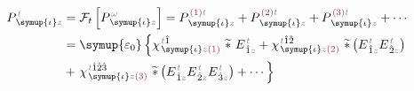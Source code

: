 \begin{subequations}
\begin{align}
	P^{\;\!\mathcolor{gray}{t}}_{\;\! \symup{\iota}\mathcolor{gray}{z}} &= \mathcal F_t \left[ P^{\;\! \mathcolor{gray}{\omega}}_{\;\! \symup{\iota}\mathcolor{gray}{z}} \right] = P^{\;\! \textcolor{Maroon}{(1)} \mathcolor{gray}{t}}_{\;\! \symup{\iota}\mathcolor{gray}{z}} + P^{\;\! \textcolor{Maroon}{(2)} \mathcolor{gray}{t}}_{\;\! \symup{\iota}\mathcolor{gray}{z}} + P^{\;\! \textcolor{Maroon}{(3)} \mathcolor{gray}{t}}_{\;\! \symup{\iota}\mathcolor{gray}{z}} + \cdots \label{P_z_nonlinear} \\ &= {\symup{\varepsilon_0}} \left\{ \chi^{\;\! \mathcolor{gray}{t} \hat{1}}_{\;\! \symup{\iota} \mathcolor{gray}{z} \textcolor{Maroon}{(1)}} ~\widetilde *~ E^{\;\!\mathcolor{gray}{t}}_{\;\! \hat{1} \mathcolor{gray}{z}} + \chi^{\;\! \mathcolor{gray}{t} \hat{1} \hat{2}}_{\;\! \symup{\iota} \mathcolor{gray}{z} \textcolor{Maroon}{(2)}}~\widetilde *\left( E^{\;\!\mathcolor{gray}{t}}_{\;\! \hat{1} \mathcolor{gray}{z}} E^{\;\!\mathcolor{gray}{t}}_{\;\! \hat{2} \mathcolor{gray}{z}} \right) \right. \\ &+ \left. \chi^{\;\! \mathcolor{gray}{t} \hat{1} \hat{2} \hat{3}}_{\;\! \symup{\iota} \mathcolor{gray}{z} \textcolor{Maroon}{(3)}}~\widetilde *\left( E^{\;\!\mathcolor{gray}{t}}_{\;\! \hat{1} \mathcolor{gray}{z}} E^{\;\!\mathcolor{gray}{t}}_{\;\! \hat{2} \mathcolor{gray}{z}} E^{\;\!\mathcolor{gray}{t}}_{\;\! \hat{3} \mathcolor{gray}{z}} \right) + \cdots \right\}
\end{align}
\end{subequations}

